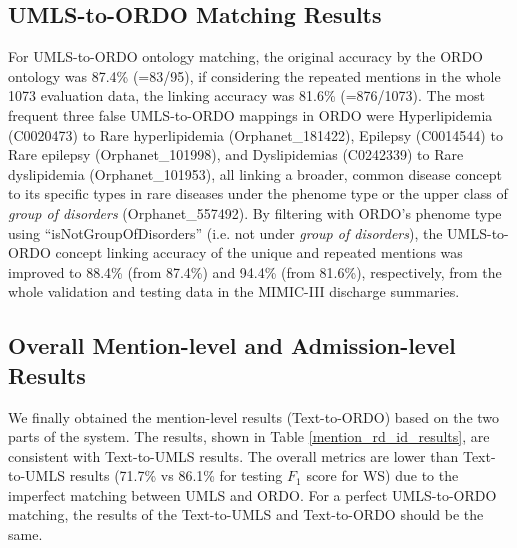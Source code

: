 \documentclass[twocolumn]{bmcart}
\begin{document}
\subsection*{UMLS-to-ORDO Matching Results}

For UMLS-to-ORDO ontology matching, the original accuracy by the ORDO ontology was 87.4\% (=83/95), if considering the repeated mentions in the whole 1073 evaluation data, the linking accuracy was 81.6\% (=876/1073). The most frequent three false UMLS-to-ORDO mappings in ORDO were Hyperlipidemia (C0020473) to Rare hyperlipidemia (Orphanet\_181422), Epilepsy (C0014544) to Rare epilepsy (Orphanet\_101998), and Dyslipidemias (C0242339) to Rare dyslipidemia (Orphanet\_101953), all linking a broader, common disease concept to its specific types in rare diseases under the phenome type or the upper class \cite{vasant2014ordo} of \textit{group of disorders} (Orphanet\_557492). By filtering with ORDO's phenome type using ``isNotGroupOfDisorders'' (i.e. not under \textit{group of disorders}), the UMLS-to-ORDO concept linking accuracy of the unique and repeated mentions was improved to 88.4\% (from 87.4\%) and 94.4\% (from 81.6\%), respectively, from the whole validation and testing data in the MIMIC-III discharge summaries.

\subsection*{Overall Mention-level and Admission-level Results}
\label{subsec:overall_men_adm_results}
We finally obtained the mention-level results (Text-to-ORDO) based on the two parts of the system. The results, shown in Table \ref{mention_rd_id_results}, are consistent with Text-to-UMLS results. The overall metrics are lower than Text-to-UMLS results (71.7\% vs 86.1\% for testing $F_1$ score for WS) due to the imperfect matching between UMLS and ORDO. For a perfect UMLS-to-ORDO matching, the results of the Text-to-UMLS and Text-to-ORDO should be the same.
\end{document}
